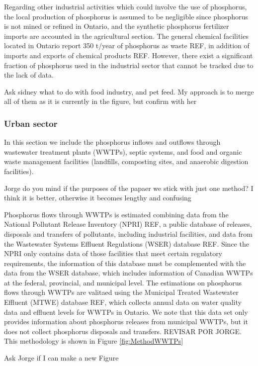 \documentclass[authoryear]{elsarticle}
\begin{document}
Regarding other industrial activities which could involve the use of phosphorus, the local production of phosphorus is assumed to be negligible since phosphorus is not mined or refined in Ontario, and the synthetic phosphorus fertilizer imports are accounted in the agricultural section. The general chemical facilities located in Ontario report 350 t/year of phosphorus as waste REF, in addition of imports and exports of chemical products REF. However, there exist a significant fraction of phosphorus used in the industrial sector that cannot be tracked due to the lack of data.

{\color{red}Ask sidney what to do with food industry, and pet feed. My approach is to merge all of them as it is currently in the figure, but confirm with her}

\subsubsection{Urban sector}
In this section we include the phosphorus inflows and outflows through wastewater treatment plants (WWTPs), septic systems, and food and organic waste management facilities (landfills, composting sites, and anaerobic digestion facilities).

{\color{red}Jorge do you mind if the purposes of the papaer we stick with just one method? I think it is better, otherwise it becomes lengthy and confusing}

Phosphorus flows through WWTPs is estimated combining data from the National Pollutant Release Inventory (NPRI) REF, a public database of releases, disposals and transfers of pollutants, including industrial facilities, and data from the Wastewater Systems Effluent Regulations (WSER) database REF. Since the NPRI only contains data of those facilities that meet certain regulatory requirements, the information of this database must be complemented with the data from the WSER database, which includes information of Canadian WWTPs at the federal, provincial, and municipal level. The estimations on phosphorus flows through WWTPs are valitaed using the Municipal Treated Wastewater Effluent (MTWE) database REF, which collects annual data on water quality data and effluent levels for WWTPs in Ontario. {\color{red}We note that this data set only provides information about phosphorus releases from municipal WWTPs, but it does not collect phosphorus disposals and transfers. REVISAR POR JORGE.} This methodology is shown in Figure \ref{fig:MethodWWTPs}

{\color{red}Ask Jorge if I can make a new Figure}
\end{document}
